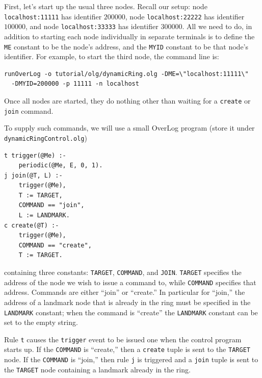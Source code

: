 \documentclass{article}
\begin{document}
First, let's start up the usual three nodes. Recall our setup: 
node \lstinline$localhost:11111$ has identifier $200000$, node
\lstinline$localhost:22222$ has identifier $100000$, and node
\lstinline$localhost:33333$ has identifier $300000$. All we need to do,
in addition to starting each node individually in separate terminals is
to define the \texttt{ME} constant to be the node's address, and the
\texttt{MYID} constant to be that node's identifier. For example, to
start the third node, the command line is:
\begin{verbatim}
runOverLog -o tutorial/olg/dynamicRing.olg -DME=\"localhost:11111\"
  -DMYID=200000 -p 11111 -n localhost
\end{verbatim}
Once all nodes are started, they do nothing other than waiting for a
\lstinline$create$ or \lstinline$join$ command.

To supply such commands, we will use a small OverLog program (store it
under \texttt{dynamicRingControl.olg})
\begin{lstlisting}
t trigger(@Me) :-
	periodic(@Me, E, 0, 1).
j join(@T, L) :-
	trigger(@Me),
	T := TARGET,
	COMMAND == "join",
	L := LANDMARK.
c create(@T) :-
	trigger(@Me),
	COMMAND == "create",
	T := TARGET.
\end{lstlisting}
containing three constants: \texttt{TARGET}, \texttt{COMMAND}, and \texttt{JOIN}.
\texttt{TARGET} specifies the address of the node we wish to issue a
command to, while \texttt{COMMAND} specifies that address. Commands are
either ``join'' or ``create.'' In particular for ``join,'' the address
of a landmark node that is already in the ring must be specified in the
\texttt{LANDMARK} constant; when the command is ``create'' the
\texttt{LANDMARK} constant can be set to the empty string.

Rule \lstinline$t$ causes the \lstinline$trigger$ event to be issued one
when the control program starts up. If the \texttt{COMMAND} is
``create,'' then a \lstinline$create$ tuple is sent to the
\texttt{TARGET} node. If the \texttt{COMMAND} is ``join,''
then rule \lstinline$j$ is triggered and a \lstinline$join$ tuple is
sent to the \texttt{TARGET} node containing a landmark already in the ring.
\end{document}

